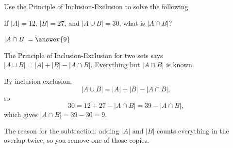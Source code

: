 \documentclass[12pt]{ximera}
\begin{document}
\begin{problem}
Use the Principle of Inclusion-Exclusion to solve the following.

If $|A|=12$, $|B|=27$, and $|A\cup B|=30$, what is $|A\cap B|$?

$|A\cap B| = \answer{9}$

\begin{hint}
The Principle of Inclusion-Exclusion for two sets says
$|A\cup B|=|A|+|B|-|A\cap B|$. Everything but $|A\cap B|$ is known.
\end{hint}

\begin{feedback}
By inclusion-exclusion,
\[ |A\cup B| = |A|+|B|-|A\cap B|, \]
so
\[ 30 = 12+27-|A\cap B| = 39 - |A\cap B|, \]
which gives $|A\cap B|=39-30=9$.

The reason for the subtraction: adding $|A|$ and $|B|$ counts everything in the
overlap twice, so you remove one of those copies.
\end{feedback}
\end{problem}
\end{document}
